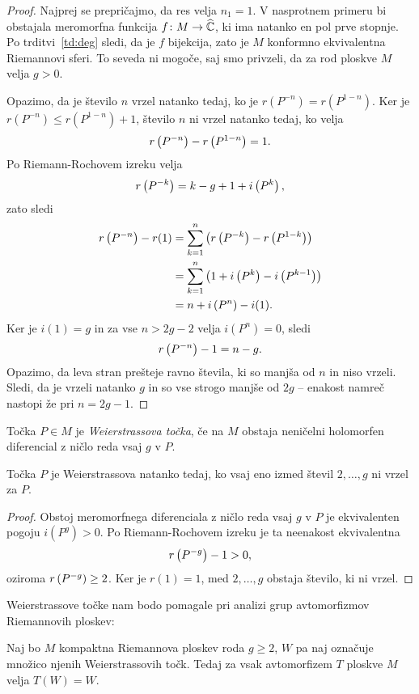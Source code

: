 \begin{proof}
Najprej se prepričajmo, da res velja $n_1 = 1$. V nasprotnem
primeru bi obstajala meromorfna funkcija $f \colon M \to \widehat{\mathbb{C}}$, ki
ima natanko en pol prve stopnje. Po trditvi~\ref{td:deg} sledi, da
je $f$ bijekcija, zato je $M$ konformno ekvivalentna Riemannovi
sferi. To seveda ni mogoče, saj smo privzeli, da za rod ploskve $M$
velja $g > 0$.

Opazimo, da je število $n$ vrzel natanko tedaj, ko je
$r(P^{-n}) = r(P^{1-n})$. Ker je $r(P^{-n}) \leq r(P^{1-n}) + 1$,
število $n$ ni vrzel natanko tedaj, ko velja
\[
r \left(P^{-n}\right) - r \left(P^{1-n}\right) = 1.
\]
Po Riemann-Rochovem izreku velja
\[
r \left(P^{-k}\right) = k-g+1 + i \left(P^k\right),
\]
zato sledi
\begin{align*}
r \left(P^{-n}\right) - r(1) &=
\sum_{k=1}^n \left(r \left(P^{-k}\right) - r \left(P^{1-k}\right)\right)
\\
&=
\sum_{k=1}^n \left(1 + i \left(P^k\right) - i \left(P^{k-1}\right)\right)
\\
&=
n + i \left(P^n\right) - i(1).
\end{align*}
Ker je $i(1) = g$ in za vse $n > 2g-2$ velja $i(P^n) = 0$, sledi
\[
r \left(P^{-n}\right) - 1 = n - g.
\]
Opazimo, da leva stran prešteje ravno števila, ki so manjša od $n$
in niso vrzeli. Sledi, da je vrzeli natanko $g$ in so vse strogo
manjše od $2g$ -- enakost namreč nastopi že pri $n = 2g - 1$.
\end{proof}

\begin{definicija}
Točka $P \in M$ je \emph{Weierstrassova točka}, če na $M$ obstaja
neničelni holomorfen diferencial z ničlo reda vsaj $g$ v
$P$.
\end{definicija}

\begin{trditev}
Točka $P$ je Weierstrassova natanko tedaj, ko vsaj eno izmed števil
$2, \dots, g$ ni vrzel za $P$.
\end{trditev}

\begin{proof}
Obstoj meromorfnega diferenciala z ničlo reda vsaj $g$ v $P$ je
ekvivalenten pogoju $i(P^g) > 0$. Po Riemann-Rochovem izreku je ta
neenakost ekvivalentna
\[
r \left(P^{-g}\right) - 1 > 0,
\]
oziroma $r \left(P^{-g}\right) \geq 2$. Ker je $r(1) = 1$, med
$2, \dots, g$ obstaja število, ki ni vrzel.
\end{proof}

Weierstrassove točke nam bodo pomagale pri analizi grup
avtomorfizmov Riemannovih ploskev:

\begin{lema}
\label{lm:perm_wei}
Naj bo $M$ kompaktna Riemannova ploskev roda $g \geq 2$, $W$ pa
naj označuje množico njenih Weierstrassovih točk. Tedaj za vsak
avtomorfizem $T$ ploskve $M$ velja $T(W) = W$.
\end{lema}

